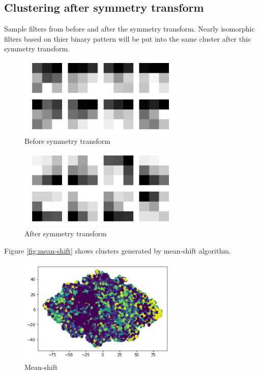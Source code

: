 \documentclass{article} %
\begin{document}
\subsection{Clustering after symmetry transform}

Sample filters from before and after the symmetry transform.
Nearly isomorphic filters based on thier binary pattern will be put into the same cluster after this symmetry transform.

\begin{figure}[H]
	\centering
	\includegraphics[width=3in]{Figures/ul7.png}
	\caption{Before symmetry transform}
	\label{fig:before}
\end{figure}

\begin{figure}[H]
	\centering
	\includegraphics[width=3in]{Figures/ul8.png}
	\caption{After symmetry transform}
	\label{fig:after}
\end{figure}

Figure \ref{fig:mean-shift} shows clusters generated by mean-shift algorithm.

\begin{figure}[H]
	\centering
	\includegraphics[width=3in]{Figures/ul4.png}
	\caption{Mean-shift}
	\label{fig:mean-shift2}
\end{figure}
\end{document}
